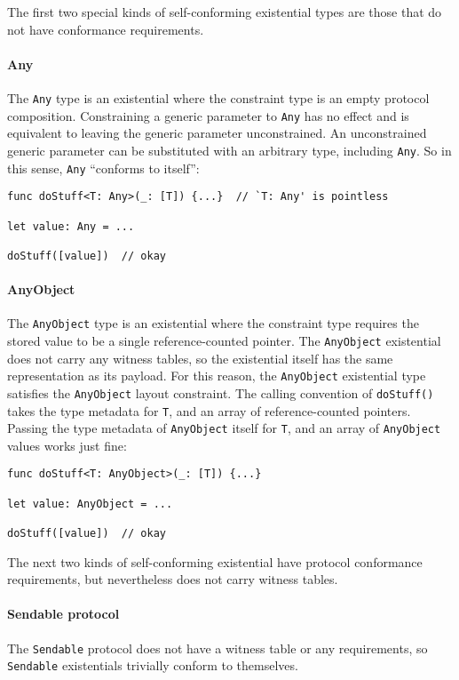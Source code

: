 \documentclass[../generics]{subfiles}
\begin{document}
The first two special kinds of self-conforming existential types are those that do not have conformance requirements.

\paragraph{Any} The \texttt{Any} type is an existential where the constraint type is an empty protocol composition. Constraining a generic parameter to \texttt{Any} has no effect and is equivalent to leaving the generic parameter unconstrained. An unconstrained generic parameter can be substituted with an arbitrary type, including \texttt{Any}. So in this sense, \texttt{Any} ``conforms to itself'':
\begin{Verbatim}
func doStuff<T: Any>(_: [T]) {...}  // `T: Any' is pointless

let value: Any = ...

doStuff([value])  // okay
\end{Verbatim}

\paragraph{AnyObject} The \texttt{AnyObject} type is an existential where the constraint type requires the stored value to be a single reference-counted pointer. The \texttt{AnyObject} existential does not carry any witness tables, so the existential itself has the same representation as its payload. For this reason, the \texttt{AnyObject} existential type satisfies the \texttt{AnyObject} layout constraint. The calling convention of \texttt{doStuff()} takes the type metadata for \texttt{T}, and an array of reference-counted pointers. Passing the type metadata of \texttt{AnyObject} itself for \texttt{T}, and an array of \texttt{AnyObject} values works just fine:
\begin{Verbatim}
func doStuff<T: AnyObject>(_: [T]) {...}

let value: AnyObject = ...

doStuff([value])  // okay
\end{Verbatim}

The next two kinds of self-conforming existential have protocol conformance requirements, but nevertheless does not carry witness tables.

\paragraph{Sendable protocol} The \texttt{Sendable} protocol does not have a witness table or any requirements, so \texttt{Sendable} existentials trivially conform to themselves.
\end{document}
